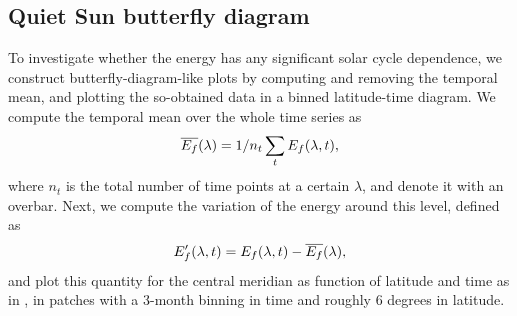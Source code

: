 \documentclass{aa}
\begin{document}
\subsection{Quiet Sun \fff butterfly diagram}\label{qsf}

To investigate whether the \fff energy has any significant solar cycle dependence, we construct butterfly-diagram-like plots by computing and removing the temporal mean, and plotting the so-obtained data in a binned latitude-time diagram. 
We compute the temporal mean over the whole time series as 
\begin{equation}
    \overline{E_f}(\lambda) = 1/n_t \sum_t E_f(\lambda,t),
\end{equation}
where $n_t$ is the total number of time points at a certain $\lambda$, and denote it with an overbar. Next, we compute the variation of the \fff energy around this level, defined as
\begin{equation}
    E_f'(\lambda,t)=E_f(\lambda,t)-\overline{E_f}(\lambda),
\end{equation}
and plot this quantity
for the central meridian
as function of latitude and time as in , 
in patches 
with a 3-month binning in time and roughly 6 degrees in latitude. 
\end{document}
